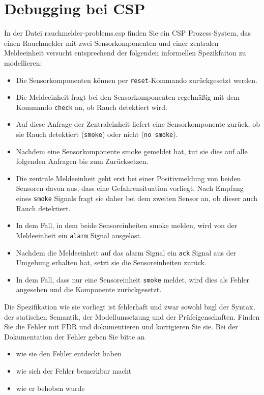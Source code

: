 \documentclass{scrreprt}
\begin{document}
\section{Debugging bei CSP}

In der Datei rauchmelder-problems.csp finden Sie ein CSP Prozess-System, das
einen Rauchmelder mit zwei Sensorkomponenten und einer zentralen Meldeeinheit
versucht entsprechend der folgenden informellen Spezikfaiton zu modellieren:

\begin{itemize}
  \item Die Sensorkomponenten können per {\tt reset}-Kommando zurückgesetzt
        werden.
  \item Die Meldeeinheit fragt bei den Sensorkomponenten regelmäßig mit dem
        Kommando {\tt check} an, ob Rauch detektiert wird.
  \item Auf diese Anfrage der Zentraleinheit liefert eine Sensorkomponente
        zurück, ob sie Rauch detektiert ({\tt smoke}) oder nicht ({\tt no smoke}).
  \item Nachdem eine Sensorkomponente smoke gemeldet hat, tut sie dies auf alle
        folgenden Anfragen bis zum Zurücksetzen.
  \item Die zentrale Meldeeinheit geht erst bei einer Positivmeldung von beiden
        Sensoren davon aus, dass eine Gefahrensituation vorliegt. Nach Empfang eines
        {\tt smoke} Signals fragt sie daher bei dem zweiten Sensor an, ob dieser
        auch Rauch detektiert.
  \item In dem Fall, in dem beide Sensoreinheiten smoke melden, wird von der
        Meldeeinheit ein {\tt alarm} Signal ausgelöst.
  \item Nachdem die Meldeeinheit auf das alarm Signal ein {\tt ack} Signal aus der
        Umgebung erhalten hat, setzt sie die Sensoreinheiten zurück.
  \item In dem Fall, dass nur eine Sensoreinheit {\tt smoke} meldet, wird dies als
        Fehler angesehen und die Komponente zurückgesetzt.
\end{itemize}

Die Spezifikation wie sie vorliegt ist fehlerhaft und zwar sowohl bzgl der
Syntax, der statischen Semantik, der Modellumsetzung und der Prüfeigenschaften.
Finden Sie die Fehler mit FDR und dokumentieren und korrigieren Sie sie. Bei
der Dokumentation der Fehler geben Sie bitte an

\begin{itemize}
  \item wie sie den Fehler entdeckt haben
  \item wie sich der Fehler bemerkbar macht
  \item wie er behoben wurde
\end{itemize}
\end{document}
